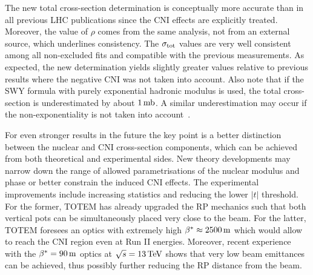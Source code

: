 The new total cross-section determination is conceptually more accurate than in all previous LHC publications since the CNI effects are explicitly treated. Moreover, the value of $\rho$ comes from the same analysis, not from an external source, which underlines consistency. The $\sigma_{\rm tot}$ values are very well consistent among all non-excluded fits and compatible with the previous measurements. As expected, the new determination yields slightly greater values relative to previous results where the negative CNI was not taken into account. Also note that if the SWY formula with purely exponential hadronic modulus is used, the total cross-section is underestimated by about $1\,{\rm mb}$. A similar underestimation may occur if the non-exponentiality is not taken into account~\cite{block16}.

For even stronger results in the future the key point is a better distinction between the nuclear and CNI cross-section components, which can be achieved from both theoretical and experimental sides. New theory developments may narrow down the range of allowed parametrisations of the nuclear modulus and phase or better constrain the induced CNI effects. The experimental improvements include increasing statistics and reducing the lower $|t|$ threshold. For the former, TOTEM has already upgraded the RP mechanics such that both vertical pots can be simultaneously placed very close to the beam. For the latter, TOTEM foresees an optics with extremely high $\beta^* \approx 2500\,{\rm m}$ which would allow to reach the CNI region even at Run II energies. Moreover, recent experience with the $\beta^* = 90\,{\rm m}$ optics at $\sqrt s = 13\,{\rm TeV}$ shows that very low beam emittances can be achieved, thus possibly further reducing the RP distance from the beam.
